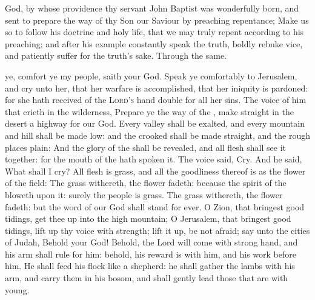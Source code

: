 \vspace{-0.15\baselineskip}

\label{JohnBaptistCollect}
 God, by whose providence thy servant John Baptist was wonderfully born, and sent to prepare the way of thy Son our Saviour by preaching repentance; Make us so to follow his doctrine and holy life, that we may truly repent according to his preaching; and after his example constantly speak the truth, boldly rebuke vice, and patiently suffer for the truth's sake. Through the same.

\vspace{-0.4\baselineskip}


\vspace{-0.15\baselineskip}

 ye, comfort ye my people, saith your God. Speak ye comfortably to Jerusalem, and cry unto her, that her warfare is accomplished, that her iniquity is pardoned: for she hath received of the {\textsc{Lord's}} hand double for all her sins. The voice of him that crieth in the wilderness, Prepare ye the way of the , make straight in the desert a highway for our God. Every valley shall be exalted, and every mountain and hill shall be made low: and the crooked shall be made straight, and the rough places plain: And the glory of the  shall be revealed, and all flesh shall see it together: for the mouth of the  hath spoken it. The voice said, Cry. And he said, What shall I cry? All flesh is grass, and all the goodliness thereof is as the flower of the field: The grass withereth, the flower fadeth: because the spirit of the  bloweth upon it: surely the people is grass. The grass withereth, the flower fadeth: but the word of our God shall stand for ever. O Zion, that bringest good tidings, get thee up into the high mountain; O Jerusalem, that bringest good tidings, lift up thy voice with strength; lift it up, be not afraid; say unto the cities of Judah, Behold your God! Behold, the Lord  will come with strong hand, and his arm shall rule for him: behold, his reward is with him, and his work before him. He shall feed his flock like a shepherd: he shall gather the lambs with his arm, and carry them in his bosom, and shall gently lead those that are with young.


